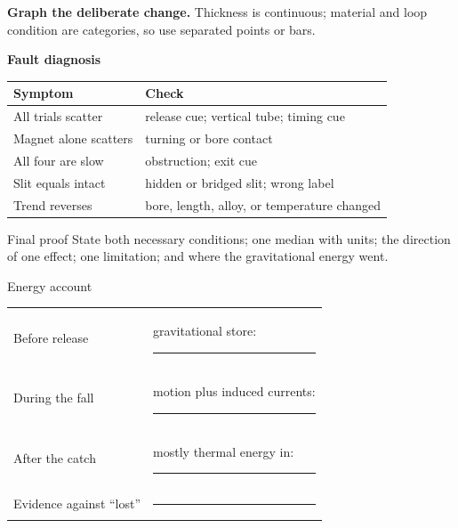 \noindent
\begin{minipage}[t]{.57\linewidth}
\textbf{Graph the deliberate change.} Thickness is continuous; material and
loop condition are categories, so use separated points or bars.
\begin{center}
\end{center}
\end{minipage}\hfill
\begin{minipage}[t]{.40\linewidth}
\textbf{Fault diagnosis}
\begin{tabularx}{\linewidth}{@{}>{\RaggedRight\arraybackslash}p{.43\linewidth}>{\RaggedRight\arraybackslash}X@{}}
\toprule Symptom & Check\\
\midrule
All trials scatter & release cue; vertical tube; timing cue\\
Magnet alone scatters & turning or bore contact\\
All four are slow & obstruction; exit cue\\
Slit equals intact & hidden or bridged slit; wrong label\\
Trend reverses & bore, length, alloy, or temperature changed\\
\bottomrule
\end{tabularx}
\end{minipage}

\begin{telospanel}{Final proof}
State both necessary conditions; one median with units; the direction of one
effect; one limitation; and where the gravitational energy went.
\end{telospanel}
\begin{teloscard}{Energy account}
\begin{tabularx}{\linewidth}{@{}p{.22\linewidth}L@{}}
Before release & gravitational store: \rule{.67\linewidth}{.3pt}\\[0.35em]
During the fall & motion plus induced currents: \rule{.49\linewidth}{.3pt}\\[0.35em]
After the catch & mostly thermal energy in: \rule{.55\linewidth}{.3pt}\\[0.35em]
Evidence against ``lost'' & \rule{.66\linewidth}{.3pt}
\end{tabularx}
\end{teloscard}

